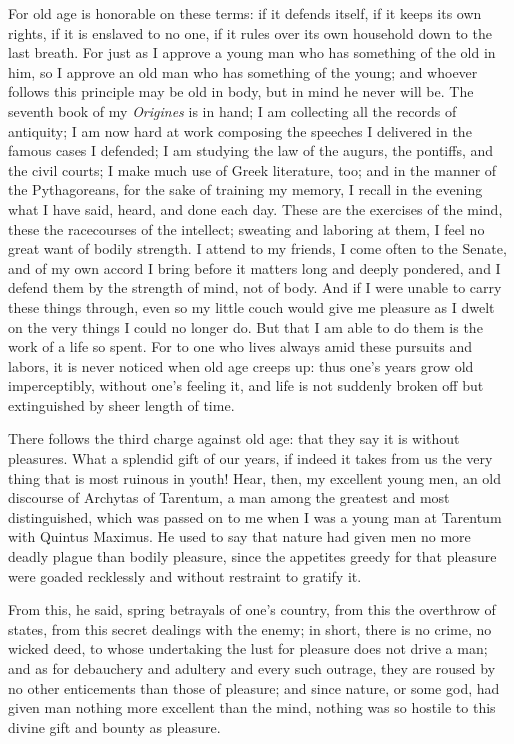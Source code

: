  For old age is honorable on these terms: if it defends itself, if it keeps its own rights, if it is enslaved to no one, if it rules over its own household down to the last breath. For just as I approve a young man who has something of the old in him, so I approve an old man who has something of the young; and whoever follows this principle may be old in body, but in mind he never will be. The seventh book of my \textit{Origines} is in hand; I am collecting all the records of antiquity; I am now hard at work composing the speeches I delivered in the famous cases I defended; I am studying the law of the augurs, the pontiffs, and the civil courts; I make much use of Greek literature, too; and in the manner of the Pythagoreans, for the sake of training my memory, I recall in the evening what I have said, heard, and done each day. These are the exercises of the mind, these the racecourses of the intellect; sweating and laboring at them, I feel no great want of bodily strength. I attend to my friends, I come often to the Senate, and of my own accord I bring before it matters long and deeply pondered, and I defend them by the strength of mind, not of body. And if I were unable to carry these things through, even so my little couch would give me pleasure as I dwelt on the very things I could no longer do. But that I am able to do them is the work of a life so spent. For to one who lives always amid these pursuits and labors, it is never noticed when old age creeps up: thus one's years grow old imperceptibly, without one's feeling it, and life is not suddenly broken off but extinguished by sheer length of time.

 There follows the third charge against old age: that they say it is without pleasures. What a splendid gift of our years, if indeed it takes from us the very thing that is most ruinous in youth! Hear, then, my excellent young men, an old discourse of Archytas of Tarentum, a man among the greatest and most distinguished, which was passed on to me when I was a young man at Tarentum with Quintus Maximus. He used to say that nature had given men no more deadly plague than bodily pleasure, since the appetites greedy for that pleasure were goaded recklessly and without restraint to gratify it.

 From this, he said, spring betrayals of one's country, from this the overthrow of states, from this secret dealings with the enemy; in short, there is no crime, no wicked deed, to whose undertaking the lust for pleasure does not drive a man; and as for debauchery and adultery and every such outrage, they are roused by no other enticements than those of pleasure; and since nature, or some god, had given man nothing more excellent than the mind, nothing was so hostile to this divine gift and bounty as pleasure.


